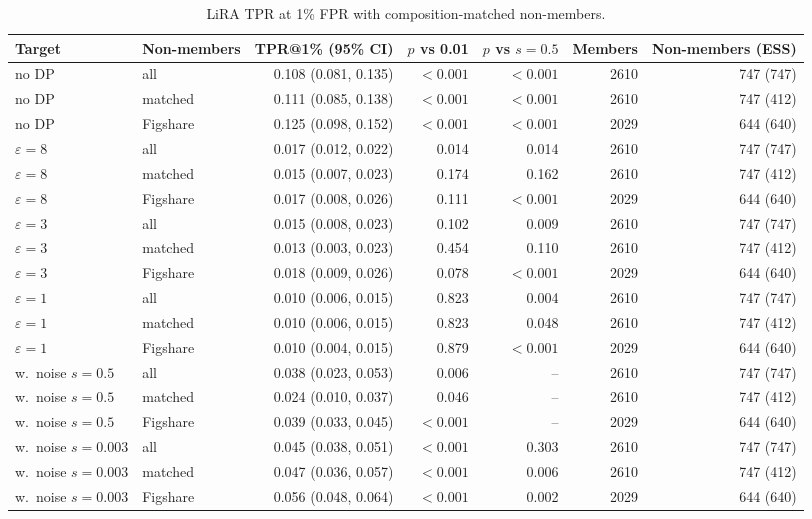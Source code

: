 \begin{table}[H]
\centering\footnotesize
\caption{LiRA TPR at 1\% FPR with composition-matched non-members.}\label{tab:s_matched}
{\begin{tabular}{llrrrrr}
\toprule
Target & Non-members & TPR@1\% (95\% CI) & $p$ vs 0.01 & $p$ vs $s=0.5$ & Members & Non-members (ESS) \\
\midrule
no DP & all & 0.108 (0.081, 0.135) & $<0.001$ & $<0.001$ & 2610 & 747 (747) \\
no DP & matched & 0.111 (0.085, 0.138) & $<0.001$ & $<0.001$ & 2610 & 747 (412) \\
no DP & Figshare & 0.125 (0.098, 0.152) & $<0.001$ & $<0.001$ & 2029 & 644 (640) \\
$\varepsilon=8$ & all & 0.017 (0.012, 0.022) & 0.014 & 0.014 & 2610 & 747 (747) \\
$\varepsilon=8$ & matched & 0.015 (0.007, 0.023) & 0.174 & 0.162 & 2610 & 747 (412) \\
$\varepsilon=8$ & Figshare & 0.017 (0.008, 0.026) & 0.111 & $<0.001$ & 2029 & 644 (640) \\
$\varepsilon=3$ & all & 0.015 (0.008, 0.023) & 0.102 & 0.009 & 2610 & 747 (747) \\
$\varepsilon=3$ & matched & 0.013 (0.003, 0.023) & 0.454 & 0.110 & 2610 & 747 (412) \\
$\varepsilon=3$ & Figshare & 0.018 (0.009, 0.026) & 0.078 & $<0.001$ & 2029 & 644 (640) \\
$\varepsilon=1$ & all & 0.010 (0.006, 0.015) & 0.823 & 0.004 & 2610 & 747 (747) \\
$\varepsilon=1$ & matched & 0.010 (0.006, 0.015) & 0.823 & 0.048 & 2610 & 747 (412) \\
$\varepsilon=1$ & Figshare & 0.010 (0.004, 0.015) & 0.879 & $<0.001$ & 2029 & 644 (640) \\
w.\ noise $s=0.5$ & all & 0.038 (0.023, 0.053) & 0.006 & -- & 2610 & 747 (747) \\
w.\ noise $s=0.5$ & matched & 0.024 (0.010, 0.037) & 0.046 & -- & 2610 & 747 (412) \\
w.\ noise $s=0.5$ & Figshare & 0.039 (0.033, 0.045) & $<0.001$ & -- & 2029 & 644 (640) \\
w.\ noise $s=0.003$ & all & 0.045 (0.038, 0.051) & $<0.001$ & 0.303 & 2610 & 747 (747) \\
w.\ noise $s=0.003$ & matched & 0.047 (0.036, 0.057) & $<0.001$ & 0.006 & 2610 & 747 (412) \\
w.\ noise $s=0.003$ & Figshare & 0.056 (0.048, 0.064) & $<0.001$ & 0.002 & 2029 & 644 (640) \\
\bottomrule
\end{tabular}}
\end{table}

